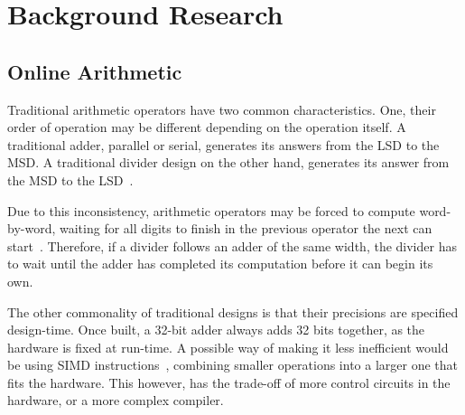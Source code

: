 \section{Background Research}

\subsection{Online Arithmetic}
Traditional arithmetic operators have two common characteristics.
One, their order of operation may be different depending on the operation
itself.
A traditional adder, parallel or serial, generates its answers from the LSD to
the MSD.
A traditional divider design on the other hand, generates its answer from
the MSD to the LSD~\cite{Brent1}\cite{Srinivas1}.

Due to this inconsistency, arithmetic operators may be forced to compute
word-by-word, waiting for all digits to finish in the previous operator the next
can start~\cite{Zhao1}.
Therefore, if a divider follows an adder of the same width, the divider has to
wait until the adder has completed its computation before it can begin its own.

The other commonality of traditional designs is that their precisions are
specified design-time. Once built, a 32-bit adder always adds 32 bits together,
as the hardware is fixed at run-time.
A possible way of making it less inefficient would be using SIMD
instructions~\cite{Duncan1}, combining smaller operations into a larger
one that fits the hardware.
This however, has the trade-off of more control circuits in the hardware, or
a more complex compiler.


